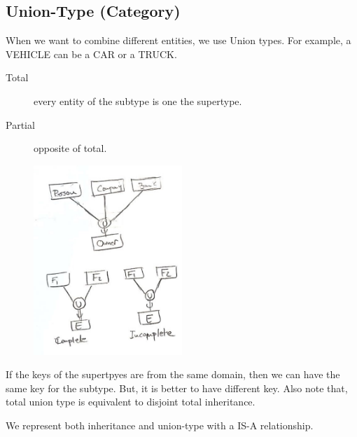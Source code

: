 \subsection{Union-Type (Category)}
When we want to combine different entities, we use Union types. For example, a VEHICLE can be a CAR or a  TRUCK. 
\begin{description}
    \item [Total] every entity of the subtype is one the supertype.
    \item [Partial] opposite of total.
\end{description}
\begin{figure}[H]
    \centering
    \includegraphics[width = 0.5\textwidth]{Graphics/union.jpg}
\end{figure}

If the keys of the supertpyes are from the same domain, then we can have the same key for the subtype. But, it is better to have different key. Also note that, total union type is equivalent to disjoint total inheritance. 

We represent both inheritance and union-type with a IS-A relationship. 


